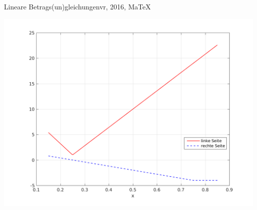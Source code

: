 \begin{MAufgabe}{Lineare Betrags(un)gleichungen}{vr, 2016, MaTeX}
 \begin{center}
 \includegraphics[width=0.8\linewidth]{Abb_zur_Ag_autogenerated_abs_4.png} \end{center}
 
\else\relax\fi
 \end{MAufgabe}